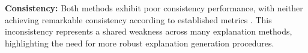 \textbf{Consistency:} Both methods exhibit poor consistency performance, with neither achieving remarkable consistency according to established metrics \cite{bodria2023benchmarking}. This inconsistency represents a shared weakness across many explanation methods, highlighting the need for more robust explanation generation procedures.

